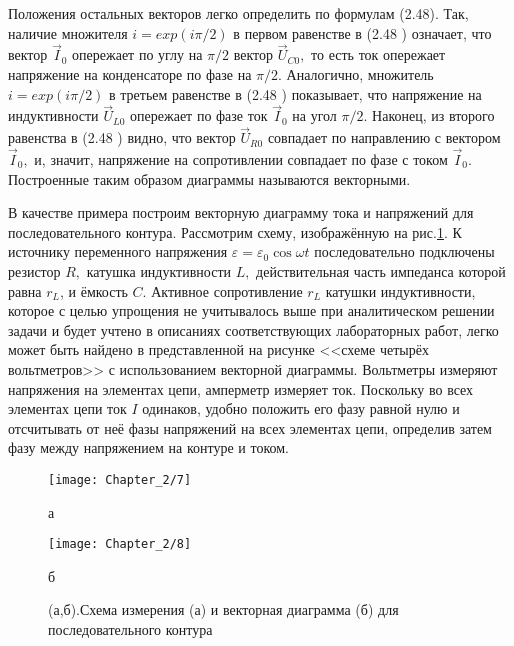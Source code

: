 {Положения остальных векторов легко определить по формулам (2.48). Так, наличие множителя $i=exp(i\pi/2)$ в первом равенстве в (2.48 ) означает, что вектор $\vec I_0$ опережает по углу на $\pi/2$ вектор $\vec U_{C0},$ то есть ток опережает напряжение на конденсаторе по фазе на $\pi/2.$ Аналогично, множитель $i=exp(i\pi/2)$ в третьем равенстве в (2.48 ) показывает, что напряжение на индуктивности $\vec U_{L0}$ опережает по фазе ток $\vec I_0$ на угол $\pi/2.$ Наконец, из второго равенства в (2.48 ) видно, что вектор $\vec U_{R0}$ совпадает по направлению с вектором $\vec I_0,$ и, значит, напряжение на сопротивлении совпадает по фазе с током $\vec I_0$. Построенные таким образом диаграммы называются \textsf{векторными.}

В качестве примера построим векторную диаграмму тока и напряжений для последовательного контура. Рассмотрим схему, изображённую на рис.\ref{fig5}. К источнику переменного напряжения $\varepsilon=\varepsilon_0\cos\omega t$ последовательно подключены резистор $R,$ катушка индуктивности $L,$ действительная часть импеданса которой равна $r_L$, и ёмкость $C.$ Активное сопротивление $r_L$ катушки индуктивности, которое с целью упрощения не учитывалось выше при аналитическом решении задачи и будет учтено в описаниях соответствующих лабораторных работ, легко может быть найдено в представленной на рисунке <<схеме четырёх вольтметров>> с использованием векторной диаграммы. Вольтметры измеряют напряжения на элементах цепи, амперметр измеряет ток. Поскольку во всех элементах цепи ток $I$ одинаков, удобно положить его фазу равной нулю и отсчитывать от неё фазы напряжений на всех элементах цепи, определив затем фазу   между напряжением на контуре и током.

\begin{figure}[h]
	\begin{minipage}[h]{0.37\linewidth}
		\centering
		\texttt{[image: Chapter\_2/7]}
		\caption{а}
	\end{minipage}
	\hfill
	\begin{minipage}[h]{0.49\linewidth}
		\centering
		\texttt{[image: Chapter\_2/8]}
		\caption{б}
	\end{minipage}
	\caption{(а,б).Схема измерения (а) и векторная  диаграмма (б) для последовательного контура}
	\label{fig5}
\end{figure}

}
